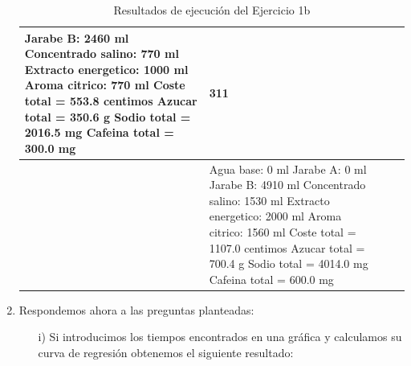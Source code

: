 \documentclass[11pt]{article}
\begin{document}
\begin{enumerate}[label=\alph*)]
\begin{table}[H]
\begin{tabular}{| >{\centering\arraybackslash}m{3cm} | m{5.75cm} | >{\centering\arraybackslash}m{3cm} | >{\centering\arraybackslash}m{4.5cm} |}
            Jarabe B: 2460 ml \newline
            Concentrado salino: 770 ml \newline
            Extracto energetico: 1000 ml \newline
            Aroma citrico: 770 ml \newline
             \newline
            Coste total = 553.8 centimos \newline
            Azucar total = 350.6 g \newline
            Sodio total = 2016.5 mg \newline
            Cafeina total = 300.0 mg
            & 311
            \\
            \hline
            10000 & 
            \scriptsize
            Agua base: 0 ml \newline
            Jarabe A: 0 ml \newline
            Jarabe B: 4910 ml \newline
            Concentrado salino: 1530 ml \newline
            Extracto energetico: 2000 ml \newline
            Aroma citrico: 1560 ml \newline
             \newline
            Coste total = 1107.0 centimos \newline
            Azucar total = 700.4 g \newline
            Sodio total = 4014.0 mg \newline
            Cafeina total = 600.0 mg
            & 1609
            \\
            \hline
        \end{tabular}%
        \caption{Resultados de ejecución del Ejercicio 1b}
        \label{tab:resultados_1b} 
    \end{table}

    \item Respondemos ahora a las preguntas planteadas:
    \begin{enumerate}
        \item [i)] Si introducimos los tiempos encontrados en una gráfica y calculamos su curva de regresión obtenemos el siguiente resultado:
        \datatableA


\end{enumerate}
\end{enumerate}
\end{document}
